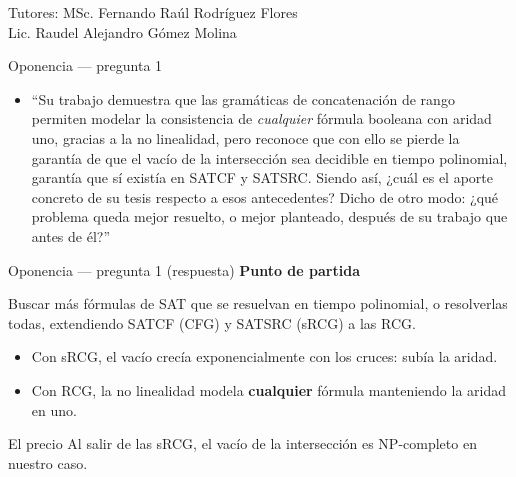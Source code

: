 \documentclass{beamer}
\newcommand{\tutores}{MSc. Fernando Raúl Rodríguez Flores \\ Lic. Raudel Alejandro Gómez Molina}
\begin{document}
\begin{frame}
  \titlepage
  \begin{center}
    Tutores: \tutores
  \end{center}
\end{frame}

\appendix

\begin{frame}{Oponencia --- pregunta 1}
  \small
  \begin{itemize}
    \item ``Su trabajo demuestra que las gramáticas de concatenación de rango permiten modelar la consistencia de \emph{cualquier} fórmula booleana con aridad uno, gracias a la no linealidad, pero reconoce que con ello se pierde la garantía de que el vacío de la intersección sea decidible en tiempo polinomial, garantía que sí existía en SATCF y SATSRC. Siendo así, ¿cuál es el aporte concreto de su tesis respecto a esos antecedentes? Dicho de otro modo: ¿qué problema queda mejor resuelto, o mejor planteado, después de su trabajo que antes de él?''
  \end{itemize}
\end{frame}

\begin{frame}{Oponencia --- pregunta 1 (respuesta)}
  \textbf{Punto de partida}

  Buscar más fórmulas de SAT que se resuelvan en tiempo polinomial, o resolverlas todas, extendiendo SATCF (CFG) y SATSRC (sRCG) a las RCG.

  \pause
  \vspace{0.3cm}

  \begin{itemize}
    \item Con sRCG, el vacío crecía exponencialmente con los cruces: subía la aridad.
    \item \pause Con RCG, la no linealidad modela \textbf{cualquier} fórmula manteniendo la aridad en uno.
  \end{itemize}

  \pause

  \begin{block}{El precio}
    Al salir de las sRCG, el vacío de la intersección es NP-completo en nuestro caso.
  \end{block}
\end{frame}
\end{document}

